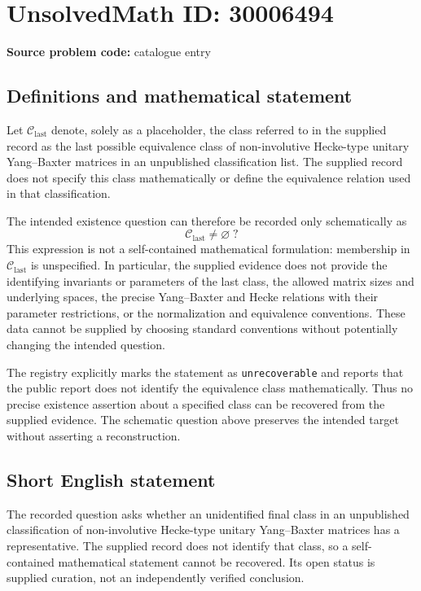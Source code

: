 \documentclass[11pt]{article}
\begin{document}
\section*{UnsolvedMath ID: 30006494}
\textbf{Source problem code:} catalogue entry
\subsection{Definitions and mathematical statement}
Let \(\mathcal C_{\mathrm{last}}\) denote, solely as a placeholder, the class referred to in the supplied record as the last possible equivalence class of non-involutive Hecke-type unitary Yang--Baxter matrices in an unpublished classification list. The supplied record does not specify this class mathematically or define the equivalence relation used in that classification.

The intended existence question can therefore be recorded only schematically as
\[
\mathcal C_{\mathrm{last}}\ne\varnothing\;?
\]
This expression is not a self-contained mathematical formulation: membership in \(\mathcal C_{\mathrm{last}}\) is unspecified. In particular, the supplied evidence does not provide the identifying invariants or parameters of the last class, the allowed matrix sizes and underlying spaces, the precise Yang--Baxter and Hecke relations with their parameter restrictions, or the normalization and equivalence conventions. These data cannot be supplied by choosing standard conventions without potentially changing the intended question.

The registry explicitly marks the statement as \texttt{unrecoverable} and reports that the public report does not identify the equivalence class mathematically. Thus no precise existence assertion about a specified class can be recovered from the supplied evidence. The schematic question above preserves the intended target without asserting a reconstruction.
\subsection{Short English statement}
The recorded question asks whether an unidentified final class in an unpublished classification of non-involutive Hecke-type unitary Yang--Baxter matrices has a representative. The supplied record does not identify that class, so a self-contained mathematical statement cannot be recovered. Its open status is supplied curation, not an independently verified conclusion.
\end{document}
